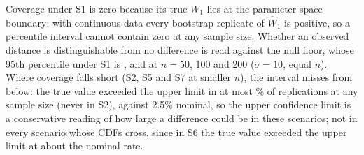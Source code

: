 \documentclass[AMA,Times1COL]{WileyNJDv5}
\begin{document}
Coverage under S1 is zero because its true $W_1$ lies at the parameter space boundary: with continuous data every bootstrap replicate of $\widehat{W}_1$ is positive, so a percentile interval cannot contain zero at any sample size. Whether an observed distance is distinguishable from no difference is read against the null floor, whose 95th percentile under S1 is ,  and  at $n = 50$, 100 and 200 ($\sigma = 10$, equal $n$). Where coverage falls short (S2, S5 and S7 at smaller $n$), the interval misses from below: the true value exceeded the upper limit in at most \% of replications at any sample size (never in S2), against 2.5\% nominal, so the upper confidence limit is a conservative reading of how large a difference could be in these scenarios; not in every scenario whose CDFs cross, since in S6 the true value exceeded the upper limit at about the nominal rate.
\end{document}
